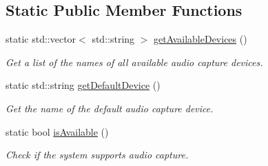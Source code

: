 \subsection*{Static Public Member Functions}
\begin{DoxyCompactItemize}
\item 
static std\+::vector$<$ std\+::string $>$ \mbox{\hyperlink{classsf_1_1_sound_recorder_a26198c5c11efcd61f426f326fe314afe}{get\+Available\+Devices}} ()
\begin{DoxyCompactList}\small\item\em Get a list of the names of all available audio capture devices. \end{DoxyCompactList}\item 
static std\+::string \mbox{\hyperlink{classsf_1_1_sound_recorder_ad1d450a80642dab4b632999d72a1bf23}{get\+Default\+Device}} ()
\begin{DoxyCompactList}\small\item\em Get the name of the default audio capture device. \end{DoxyCompactList}\item 
static bool \mbox{\hyperlink{classsf_1_1_sound_recorder_aab2bd0fee9e48d6cfd449b1cb078ce5a}{is\+Available}} ()
\begin{DoxyCompactList}\small\item\em Check if the system supports audio capture. \end{DoxyCompactList}\end{DoxyCompactItemize}
